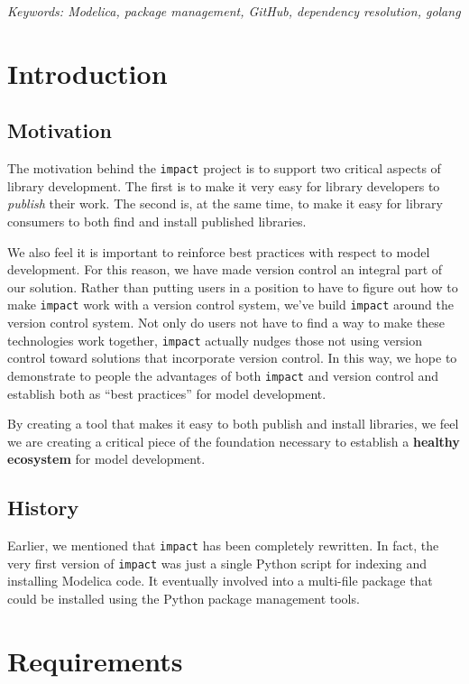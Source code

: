 \documentclass[11pt,a4paper,twocolumn]{article}
\newcommand{\code}[1]{\texttt{#1}} %
\begin{document}
\noindent\emph{Keywords: Modelica, package management, GitHub, dependency resolution, golang}

\section{Introduction}

\subsection{Motivation}

The motivation behind the \code{impact} project is to support two
critical aspects of library development.  The first is to make it very
easy for library developers to \emph{publish} their work.  The second
is, at the same time, to make it easy for library consumers to both
find and install published libraries.

We also feel it is important  to reinforce best practices with respect
to model development.   For this reason, we have  made version control
an integral  part of  our solution.   Rather than  putting users  in a
position to have  to figure out how to make  \code{impact} work with a
version control  system, we've build \code{impact}  around the version
control system.   Not only  do users not  have to find  a way  to make
these technologies work together,  \code{impact} actually nudges those
not using  version control  toward solutions that  incorporate version
control.  In this way, we hope to demonstrate to people the advantages
of both \code{impact} and version control and establish both as ``best
practices'' for model development.

By creating a tool that makes it easy to both publish and install
libraries, we feel we are creating a critical piece of the foundation
necessary to establish a \textbf{healthy ecosystem} for model
development.

\subsection{History}

Earlier, we mentioned that \code{impact} has been completely
rewritten.  In fact, the very first version of \code{impact} was just
a single Python script for indexing and installing Modelica
code\parencite{impact-gist}.  It eventually involved into a multi-file
package that could be installed using the Python package management
tools.

\section{Requirements}
\end{document}
